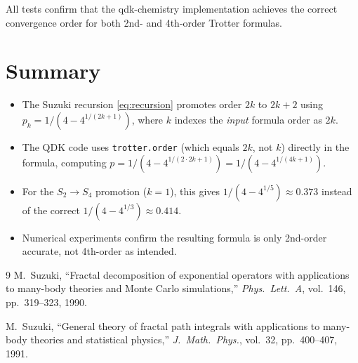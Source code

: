 \documentclass[11pt]{article}
\begin{document}
\noindent
All tests confirm that the qdk-chemistry implementation achieves the correct
convergence order for both 2nd- and 4th-order Trotter formulas.

\section{Summary}

\begin{itemize}
  \item The Suzuki recursion \eqref{eq:recursion} promotes order $2k$ to
    $2k+2$ using $p_k = 1/(4 - 4^{1/(2k+1)})$, where $k$ indexes the
    \emph{input} formula order as $2k$.
  \item The QDK code uses \texttt{trotter.order} (which equals $2k$, not $k$)
    directly in the formula, computing
    $p = 1/(4 - 4^{1/(2 \cdot 2k + 1)}) = 1/(4 - 4^{1/(4k+1)})$.
  \item For the $S_2 \to S_4$ promotion ($k=1$), this gives
    $1/(4-4^{1/5}) \approx 0.373$ instead of the correct
    $1/(4-4^{1/3}) \approx 0.414$.
  \item Numerical experiments confirm the resulting formula is only 2nd-order
    accurate, not 4th-order as intended.
\end{itemize}

\begin{thebibliography}{9}
  M.~Suzuki,
  ``Fractal decomposition of exponential operators with applications to
  many-body theories and Monte Carlo simulations,''
  \textit{Phys.\ Lett.\ A}, vol.~146, pp.~319--323, 1990.

  M.~Suzuki,
  ``General theory of fractal path integrals with applications to many-body
  theories and statistical physics,''
  \textit{J.\ Math.\ Phys.}, vol.~32, pp.~400--407, 1991.
\end{thebibliography}
\end{document}
